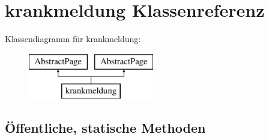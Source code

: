\hypertarget{classkrankmeldung}{}\section{krankmeldung Klassenreferenz}
\label{classkrankmeldung}
Klassendiagramm für krankmeldung\+:\begin{figure}[H]
\begin{center}
\leavevmode
\includegraphics[height=2.000000cm]{classkrankmeldung}
\end{center}
\end{figure}
\subsection*{Öffentliche, statische Methoden}
